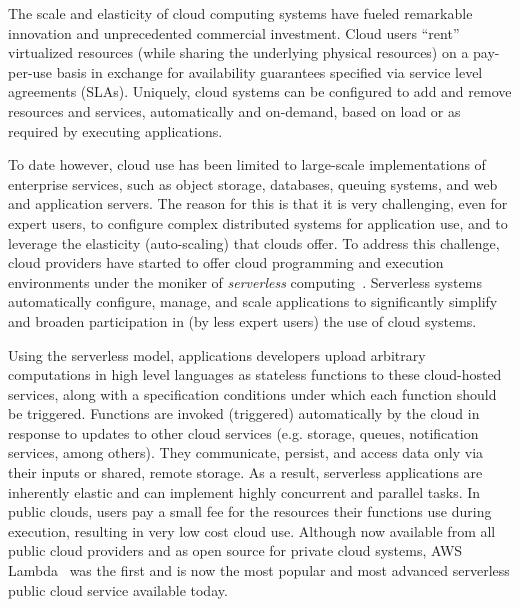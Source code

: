 The scale and elasticity of cloud computing systems have 
fueled remarkable innovation and unprecedented commercial 
investment.  Cloud users ``rent'' virtualized resources (while sharing
the underlying physical resources) on a pay-per-use basis
in exchange for availability guarantees specified via service level
agreements (SLAs). Uniquely, cloud systems can be configured 
to add and remove resources and services,
automatically and on-demand, based on load 
or as required by executing applications.

To date however, cloud use has been limited to large-scale 
implementations of enterprise services, such as
object storage, databases, queuing systems, and web and application servers.
The reason for this is that it is very
challenging, even for expert users, to configure complex
distributed systems for application use, 
and to leverage the elasticity (auto-scaling) that
clouds offer. To address this challenge, cloud providers 
have started to offer cloud programming and execution environments
under the moniker of \textit{serverless} 
computing~\cite{xxx,yyy,zzz}.  Serverless
systems automatically configure, manage, and scale applications
to significantly simplify and broaden participation in (by less expert
users) the use of cloud systems.

Using the serverless model, applications developers upload 
arbitrary computations in high level languages
as stateless functions to these cloud-hosted services, along with a
specification conditions under which each
function should be triggered.  Functions are invoked (triggered)
automatically by the cloud in response to updates to other cloud services
(e.g. storage, queues, notification services, among others). They
communicate, persist, and access data only 
via their inputs or shared, remote storage.  
As a result, serverless applications are inherently elastic and can 
implement highly concurrent and parallel tasks.
In public clouds, users pay a small fee for the resources their 
functions use during execution, resulting in very low cost cloud use.
Although now available from all public cloud providers and as open 
source for private cloud systems, 
AWS Lambda~\cite{awslambda} was the first and is now the 
most popular and most advanced serverless public cloud service 
available today.

